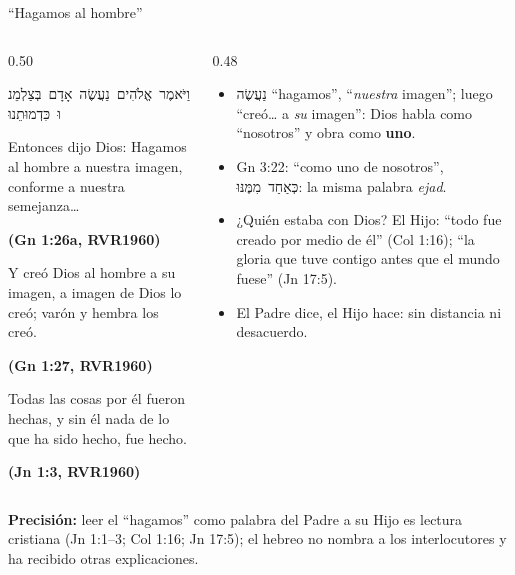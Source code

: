 \documentclass[hyperref={bookmarks=false},aspectratio=169]{beamer}
\newcommand{\heb}[1]{\mbox{\foreignlanguage{hebrew}{#1}}}
\newcommand{\fuente}[1]{\par\hfill{\upshape\bfseries\footnotesize\textcolor{azul}{#1}}}
\newcommand{\destacar}[1]{\textbf{\textcolor{azul}{#1}}}
\newcommand{\precision}[1]{{\footnotesize\color{gris}\textbf{Precisión:} #1}}
\begin{document}
\begin{frame}{``Hagamos al hombre''}
\begin{columns}[t,onlytextwidth]
\begin{column}{0.50\textwidth}
\begin{center}\small\heb{וַיֹּאמֶר אֱלֹהִים נַעֲשֶׂה אָדָם בְּצַלְמֵנוּ כִּדְמוּתֵנוּ}\end{center}
\begin{cita}[fontupper=\scriptsize\itshape]Entonces dijo Dios: Hagamos al hombre a nuestra imagen, conforme a nuestra semejanza\ldots\fuente{(Gn 1:26a, RVR1960)}\end{cita}
\begin{cita}[fontupper=\scriptsize\itshape]Y creó Dios al hombre a su imagen, a imagen de Dios lo creó; varón y hembra los creó.\fuente{(Gn 1:27, RVR1960)}\end{cita}
\begin{cita}[fontupper=\scriptsize\itshape]Todas las cosas por él fueron hechas, y sin él nada de lo que ha sido hecho, fue hecho.\fuente{(Jn 1:3, RVR1960)}\end{cita}
\end{column}
\begin{column}{0.48\textwidth}\small
\begin{itemize}
\item \heb{נַעֲשֶׂה} ``hagamos'', ``\emph{nuestra} imagen''; luego ``creó\ldots{} a \emph{su} imagen'': Dios habla como ``nosotros'' y obra como \destacar{uno}.
\item Gn 3:22: ``como uno de nosotros'', \heb{כְּאַחַד מִמֶּנּוּ}: la misma palabra \emph{ejad}.
\item ¿Quién estaba con Dios? El Hijo: ``todo fue creado por medio de él'' (Col 1:16); ``la gloria que tuve contigo antes que el mundo fuese'' (Jn 17:5).
\item El Padre dice, el Hijo hace: sin distancia ni desacuerdo.
\end{itemize}
\end{column}
\end{columns}\par\smallskip
\precision{leer el ``hagamos'' como palabra del Padre a su Hijo es lectura cristiana (Jn 1:1--3; Col 1:16; Jn 17:5); el hebreo no nombra a los interlocutores y ha recibido otras explicaciones.}
\end{frame}
\end{document}
